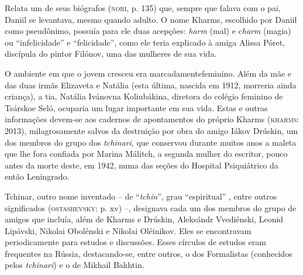 Relata um de seus biógrafos (\textsc{nori}, p. 135) que, sempre que
falava com o pai, Daniil se levantava, mesmo quando adulto. O nome
Kharms, escolhido por Daniil como pseudônimo, possuía para ele duas
acepções: \emph{harm} (mal) e c\emph{harm} (magia) ou ``infelicidade'' e
``felicidade'', como ele teria explicado à amiga Alissa Póret, discípula
do pintor Filónov, uma das mulheres de sua vida.

O ambiente em que o jovem cresceu era marcadamentefeminino. Além da mãe
e das duas irmãs Elizaveta e Natália (esta última, nascida em 1912,
morreria ainda criança), a tia, Natália Ivánovna Koliubákina, diretora
do colégio feminino de Tsárskoe Seló, ocuparia um lugar importante em
sua vida. Estas e outras informações devem-se aos cadernos de
apontamentos do próprio Kharms (\textsc{kharms}: 2013), milagrosamente
salvos da destruição por obra do amigo Iákov Drúskin, um dos membros do
grupo dos \emph{tchinari}, que conservou durante muitos anos a maleta
que lhe fora confiada por Marina Málitch, a segunda mulher do escritor,
pouco antes da morte deste, em 1942, numa das seções do Hospital
Psiquiátrico da então Leningrado.

Tchinar, outro nome inventado -- de ``\emph{tchin}'', grau
``espiritual'' , entre outros significados (\textsc{ostashevsky}: p. xv)
--, designava cada um dos membros do grupo de amigos que incluía, além
de Kharms e Drúskin, Aleksándr Vvediénski, Leonid Lipávski, Nikolai
Obolénski e Nikolai Oléinikov. Eles se encontravam periodicamente para
estudos e discussões. Esses círculos de estudos eram frequentes na
Rússia, destacando-se, entre outros, o dos Formalistas (conhecidos pelos
\emph{tchinari}) e o de Mikhail Bakhtin.

